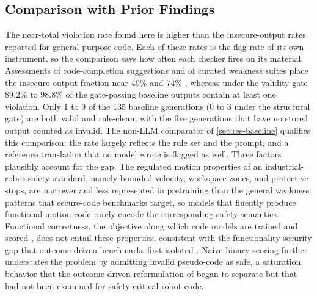 \documentclass{ieeeaccess}
\begin{document}
\subsection{Comparison with Prior Findings}\label{sec:comparison}
The near-total violation rate found here is higher than the insecure-output rates reported
for general-purpose code. Each of these rates is the flag rate of its own instrument, so the
comparison says how often each checker fires on its material. Assessments of code-completion suggestions and of curated weakness
suites place the insecure-output fraction near 40\% \cite{ref5} and 74\% \cite{ref6},
whereas under the validity gate 89.2\% to 98.8\% of the gate-passing baseline outputs contain
at least one violation. Only 1 to 9 of the 135 baseline generations (0 to 3 under the
structural gate) are both valid and rule-clean, with the five generations that have no
stored output counted as invalid. The non-LLM
comparator of \ref{sec:res-baseline} qualifies this comparison: the rate largely reflects
the rule set and the prompt, and a reference translation that no model wrote is flagged as
well. Three factors
plausibly account for the gap. The regulated motion properties of an industrial-robot
safety standard, namely bounded velocity, workspace zones, and protective stops, are
narrower and less represented in pretraining than the general weakness patterns that
secure-code benchmarks target, so models that fluently produce functional motion code
rarely encode the corresponding safety semantics. Functional correctness, the objective
along which code models are trained and scored \cite{ref13, ref14}, does not entail these
properties, consistent with the functionality-security gap that outcome-driven benchmarks
first isolated \cite{ref7}. Naive binary scoring further understates the problem by
admitting invalid pseudo-code as safe, a saturation behavior that the outcome-driven
reformulation of \cite{ref7} began to separate but that had not been examined for
safety-critical robot code.
\end{document}
